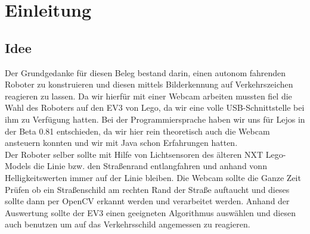 \section{Einleitung}
\subsection{Idee}
Der Grundgedanke für diesen Beleg bestand darin, einen autonom fahrenden Roboter zu konstruieren und diesen mittels Bilderkennung auf Verkehrszeichen reagieren zu lassen. Da wir hierfür mit einer Webcam arbeiten mussten fiel die Wahl des Roboters auf den EV3 von Lego, da wir eine volle USB-Schnittstelle bei ihm zu Verfügung hatten. Bei der Programmiersprache haben wir uns für Lejos in der Beta 0.81 entschieden, da wir hier rein theoretisch auch die Webcam ansteuern konnten und wir mit Java schon Erfahrungen hatten. \\
Der Roboter selber sollte mit Hilfe von Lichtsensoren des älteren NXT Lego-Models die Linie bzw. den Straßenrand entlangfahren und anhand vonn Helligkeitswerten immer auf der Linie bleiben. Die Webcam sollte die Ganze Zeit Prüfen ob ein Straßenschild am rechten Rand der Straße auftaucht und dieses sollte dann per OpenCV erkannt werden und verarbeitet werden. Anhand der Auswertung sollte der EV3 einen geeigneten Algorithmus auswählen und diesen auch benutzen um auf das Verkehrsschild angemessen zu reagieren.
